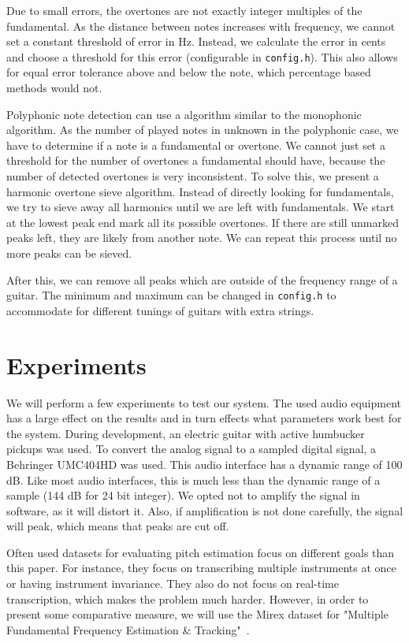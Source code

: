 \documentclass[10pt,twocolumn]{article}
\begin{document}
Due to small errors, the overtones are not exactly integer multiples of the fundamental. As the distance between notes increases with frequency, we cannot set a constant threshold of error in Hz. Instead, we calculate the error in cents and choose a threshold for this error (configurable in \texttt{config.h}). This also allows for equal error tolerance above and below the note, which percentage based methods would not.

Polyphonic note detection can use a algorithm similar to the monophonic algorithm. As the number of played notes in unknown in the polyphonic case, we have to determine if a note is a fundamental or overtone. We cannot just set a threshold for the number of overtones a fundamental should have, because the number of detected overtones is very inconsistent. To solve this, we present a harmonic overtone sieve algorithm. Instead of directly looking for fundamentals, we try to sieve away all harmonics until we are left with fundamentals. We start at the lowest peak end mark all its possible overtones. If there are still unmarked peaks left, they are likely from another note. We can repeat this process until no more peaks can be sieved.

After this, we can remove all peaks which are outside of the frequency range of a guitar. The minimum and maximum can be changed in \texttt{config.h} to accommodate for different tunings of guitars with extra strings.


\section{Experiments}  \label{sec:exp}
We will perform a few experiments to test our system. The used audio equipment has a large effect on the results and in turn effects what parameters work best for the system. During development, an electric guitar with active humbucker pickups was used. To convert the analog signal to a sampled digital signal, a Behringer UMC404HD was used. This audio interface has a dynamic range of 100 dB. Like most audio interfaces, this is much less than the dynamic range of a sample (144 dB for 24 bit integer). We opted not to amplify the signal in software, as it will distort it. Also, if amplification is not done carefully, the signal will peak, which means that peaks are cut off.

Often used datasets for evaluating pitch estimation focus on different goals than this paper. For instance, they focus on transcribing multiple instruments at once or having instrument invariance. They also do not focus on real-time transcription, which makes the problem much harder. However, in order to present some comparative measure, we will use the Mirex dataset for "Multiple Fundamental Frequency Estimation \& Tracking"~\cite{data}.
\end{document}
